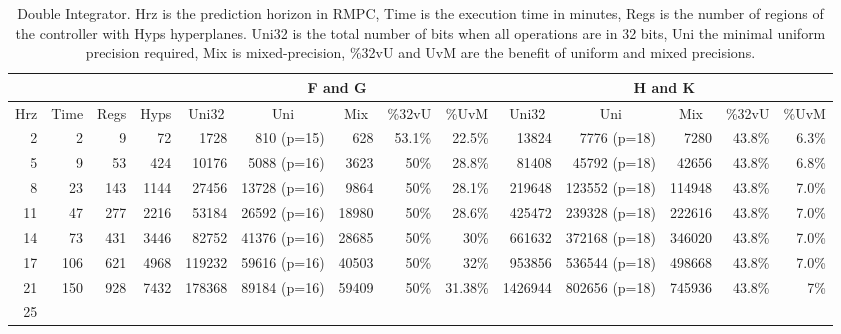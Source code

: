 \begin{table*}[t]
  \centering
  \caption{Double Integrator.\textmd{ Hrz is the prediction horizon in RMPC, Time is the execution time in minutes, Regs is the number of regions of the controller with Hyps hyperplanes. Uni32 is the total number of bits when all operations are in 32 bits, Uni the minimal uniform precision required, Mix is mixed-precision, \%32vU and UvM are the benefit of uniform and mixed precisions.}}
  \label{tab:di}
  \begin{tabular}{|rrrrrrrrrrrrrr|}
    \cline{5-14}
    \multicolumn{4}{c}{} &
    \multicolumn{5}{|c|}{F and G} &
    \multicolumn{5}{c|}{H and K} \\
    \hline
    \multicolumn{1}{|c}{Hrz}&
    \multicolumn{1}{c}{Time}&
    \multicolumn{1}{c}{Regs} &
    \multicolumn{1}{c}{Hyps} &
    \multicolumn{1}{c}{Uni32}&
    \multicolumn{1}{c}{Uni}&
    \multicolumn{1}{c}{Mix}&
    \multicolumn{1}{c}{\%32vU}&
    \multicolumn{1}{c}{\%UvM}&
    \multicolumn{1}{c}{Uni32}&
    \multicolumn{1}{c}{Uni}&
    \multicolumn{1}{c}{Mix}&
    \multicolumn{1}{c}{\%32vU}&
    \multicolumn{1}{c|}{\%UvM} \\
    \hline
    2 & 2 & 9 & 72 & 1728 & 810 (p=15) & 628 & 53.1\% & 22.5\% & 13824 & 7776 (p=18) & 7280 & 43.8\%& 6.3\% \\
    5 & 9 & 53 & 424 & 10176 & 5088 (p=16) & 3623 & 50\% & 28.8\% & 81408 & 45792 (p=18) & 42656 & 43.8\% & 6.8\% \\
    8 & 23 & 143 & 1144 & 27456 & 13728 (p=16) & 9864 & 50\%  & 28.1\% & 219648 & 123552 (p=18) & 114948 & 43.8\% & 7.0\% \\
    11 & 47 & 277 & 2216 & 53184 & 26592 (p=16) & 18980 & 50\% & 28.6\% & 425472 & 239328 (p=18) & 222616 & 43.8\% & 7.0\% \\
    
    14 & 73 & 431& 3446& 82752& 41376 (p=16)& 28685& 50\% & 30\% & 661632& 372168 (p=18)& 346020& 43.8\% &7.0\% \\
    
    17 & 106 & 621 & 4968 & 119232 & 59616 (p=16) & 40503 & 50\% & 32\% & 953856& 536544 (p=18)& 498668& 43.8\% & 7.0\% \\
    
    21 & 150 & 928 & 7432 & 178368 & 89184 (p=16) & 59409 & 50\% & 31.38\% & 1426944 & 802656 (p=18) & 745936 & 43.8\% & 7\%  \\
    
    25 & & & & & & & & & & & & & \\
    
    \hline
  \end{tabular}
\end{table*}